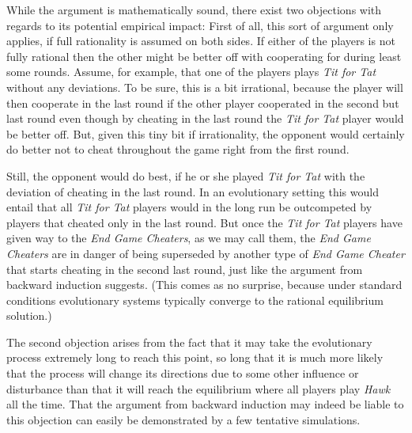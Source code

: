 While the argument is mathematically sound, there exist two objections with
regards to its potential empirical impact: First of all, this sort of
argument only applies, if full rationality is assumed on both sides. If either
of the players is not fully rational then the other might be better off with
cooperating for during least some rounds. Assume, for example, that one of the
players plays {\em Tit for Tat} without any deviations. To be sure, this is
a bit irrational, because the player will then cooperate in the last round if
the other player cooperated in the second but last round even though by
cheating in the last round the {\em Tit for Tat} player would be better
off. But, given this tiny bit if irrationality, the opponent would certainly
do better not to cheat throughout the game right from the first round.

Still, the opponent would do best, if he or she played {\em Tit for Tat} with
the deviation of cheating in the last round. In an evolutionary setting this
would entail that all {\em Tit for Tat} players would in the long run be
outcompeted by players that cheated only in the last round. But once the {\em
  Tit for Tat} players have given way to the {\em End Game Cheaters}, as we may
call them, the {\em End Game Cheaters} are in danger of being superseded by
another type of {\em End Game Cheater} that starts cheating in the second
last round, just like the argument from backward induction suggests. (This
comes as no surprise, because under standard conditions evolutionary
systems typically converge to the rational equilibrium solution.) 

The second objection arises from the fact that it may take the evolutionary
process extremely long to reach this point, so long that it is much more
likely that the process will change its directions due to some other influence
or disturbance than that it will reach the equilibrium where all players play
{\em Hawk} all the time. That the argument from backward induction may indeed
be liable to this objection can easily be demonstrated by a few tentative
simulations.

